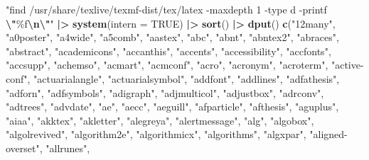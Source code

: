 \documentclass[
]{article}
\newenvironment{Shaded}{\begin{snugshade}}{\end{snugshade}}
\newcommand{\AttributeTok}[1]{\textcolor[rgb]{0.13,0.29,0.53}{#1}}
\newcommand{\ConstantTok}[1]{\textcolor[rgb]{0.56,0.35,0.01}{#1}}
\newcommand{\FunctionTok}[1]{\textcolor[rgb]{0.13,0.29,0.53}{\textbf{#1}}}
\newcommand{\NormalTok}[1]{#1}
\newcommand{\SpecialCharTok}[1]{\textcolor[rgb]{0.81,0.36,0.00}{\textbf{#1}}}
\newcommand{\StringTok}[1]{\textcolor[rgb]{0.31,0.60,0.02}{#1}}
\begin{document}
\begin{Shaded}
\begin{Highlighting}[]
\StringTok{"find /usr/share/texlive/texmf{-}dist/tex/latex {-}maxdepth 1 {-}type d {-}printf }\SpecialCharTok{\textbackslash{}"}\StringTok{\%f}\SpecialCharTok{\textbackslash{}n\textbackslash{}"}\StringTok{"} \SpecialCharTok{|\textgreater{}}
    \FunctionTok{system}\NormalTok{(}\AttributeTok{intern =} \ConstantTok{TRUE}\NormalTok{) }\SpecialCharTok{|\textgreater{}}
    \FunctionTok{sort}\NormalTok{() }\SpecialCharTok{|\textgreater{}}
    \FunctionTok{dput}\NormalTok{()}
\FunctionTok{c}\NormalTok{(}\StringTok{"12many"}\NormalTok{, }\StringTok{"a0poster"}\NormalTok{, }\StringTok{"a4wide"}\NormalTok{, }\StringTok{"a5comb"}\NormalTok{, }\StringTok{"aastex"}\NormalTok{, }\StringTok{"abc"}\NormalTok{, }
\StringTok{"abnt"}\NormalTok{, }\StringTok{"abntex2"}\NormalTok{, }\StringTok{"abraces"}\NormalTok{, }\StringTok{"abstract"}\NormalTok{, }\StringTok{"academicons"}\NormalTok{, }\StringTok{"accanthis"}\NormalTok{, }
\StringTok{"accents"}\NormalTok{, }\StringTok{"accessibility"}\NormalTok{, }\StringTok{"accfonts"}\NormalTok{, }\StringTok{"accsupp"}\NormalTok{, }\StringTok{"achemso"}\NormalTok{, }
\StringTok{"acmart"}\NormalTok{, }\StringTok{"acmconf"}\NormalTok{, }\StringTok{"acro"}\NormalTok{, }\StringTok{"acronym"}\NormalTok{, }\StringTok{"acroterm"}\NormalTok{, }\StringTok{"active{-}conf"}\NormalTok{, }
\StringTok{"actuarialangle"}\NormalTok{, }\StringTok{"actuarialsymbol"}\NormalTok{, }\StringTok{"addfont"}\NormalTok{, }\StringTok{"addlines"}\NormalTok{, }\StringTok{"adfathesis"}\NormalTok{, }
\StringTok{"adforn"}\NormalTok{, }\StringTok{"adfsymbols"}\NormalTok{, }\StringTok{"adigraph"}\NormalTok{, }\StringTok{"adjmulticol"}\NormalTok{, }\StringTok{"adjustbox"}\NormalTok{, }
\StringTok{"adrconv"}\NormalTok{, }\StringTok{"adtrees"}\NormalTok{, }\StringTok{"advdate"}\NormalTok{, }\StringTok{"ae"}\NormalTok{, }\StringTok{"aecc"}\NormalTok{, }\StringTok{"aeguill"}\NormalTok{, }\StringTok{"afparticle"}\NormalTok{, }
\StringTok{"afthesis"}\NormalTok{, }\StringTok{"aguplus"}\NormalTok{, }\StringTok{"aiaa"}\NormalTok{, }\StringTok{"akktex"}\NormalTok{, }\StringTok{"akletter"}\NormalTok{, }\StringTok{"alegreya"}\NormalTok{, }
\StringTok{"alertmessage"}\NormalTok{, }\StringTok{"alg"}\NormalTok{, }\StringTok{"algobox"}\NormalTok{, }\StringTok{"algolrevived"}\NormalTok{, }\StringTok{"algorithm2e"}\NormalTok{, }
\StringTok{"algorithmicx"}\NormalTok{, }\StringTok{"algorithms"}\NormalTok{, }\StringTok{"algxpar"}\NormalTok{, }\StringTok{"aligned{-}overset"}\NormalTok{, }\StringTok{"allrunes"}\NormalTok{, }

\end{Highlighting}
\end{Shaded}
\end{document}
